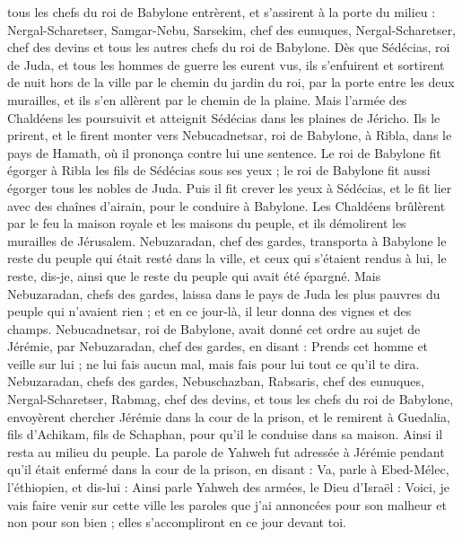\begin{multicols}{2}
tous les chefs du roi de Babylone entrèrent, et s'assirent à la porte du milieu : Nergal-Scharetser, Samgar-Nebu, Sarsekim, chef des eunuques, Nergal-Scharetser, chef des devins et tous les autres chefs du roi de Babylone.
Dès que Sédécias, roi de Juda, et tous les hommes de guerre les eurent vus, ils s'enfuirent et sortirent de nuit hors de la ville par le chemin du jardin du roi, par la porte entre les deux murailles, et ils s'en allèrent par le chemin de la plaine.
Mais l'armée des Chaldéens les poursuivit et atteignit Sédécias dans les plaines de Jéricho. Ils le prirent, et le firent monter vers Nebucadnetsar, roi de Babylone, à Ribla, dans le pays de Hamath, où il prononça contre lui une sentence.
Le roi de Babylone fit égorger à Ribla les fils de Sédécias sous ses yeux ; le roi de Babylone fit aussi égorger tous les nobles de Juda.
Puis il fit crever les yeux à Sédécias, et le fit lier avec des chaînes d'airain, pour le conduire à Babylone.
Les Chaldéens brûlèrent par le feu la maison royale et les maisons du peuple, et ils démolirent les murailles de Jérusalem.
Nebuzaradan, chef des gardes, transporta à Babylone le reste du peuple qui était resté dans la ville, et ceux qui s'étaient rendus à lui, le reste, dis-je, ainsi que le reste du peuple qui avait été épargné.
Mais Nebuzaradan, chefs des gardes, laissa dans le pays de Juda les plus pauvres du peuple qui n’avaient rien ; et en ce jour-là, il leur donna des vignes et des champs.
Nebucadnetsar, roi de Babylone, avait donné cet ordre au sujet de Jérémie, par Nebuzaradan, chef des gardes, en disant :
Prends cet homme et veille sur lui ;  ne lui fais aucun mal, mais fais pour lui tout ce qu'il te dira.
Nebuzaradan, chefs des gardes, Nebuschazban, Rabsaris, chef des eunuques, Nergal-Scharetser, Rabmag,  chef des devins, et tous les chefs du roi de Babylone,
envoyèrent chercher Jérémie dans la cour de la prison, et le remirent à Guedalia, fils d'Achikam, fils de Schaphan, pour qu’il le conduise dans sa maison. Ainsi il resta au milieu du peuple.
La parole de Yahweh fut adressée à Jérémie pendant qu'il était enfermé dans la cour de la prison, en disant :
Va,  parle à Ebed-Mélec, l’éthiopien, et dis-lui : Ainsi parle Yahweh des armées, le Dieu d'Israël : Voici, je vais faire venir sur cette ville les paroles que j’ai annoncées pour son malheur et non pour son bien ; elles s’accompliront en ce jour devant toi.

\end{multicols}

